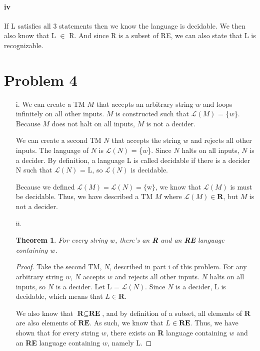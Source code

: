 \documentclass[10pt,letter]{article}
\newtheorem*{thm}{Theorem}
\begin{document}
\paragraph{iv}
If L satisfies all 3 statements then we know the language is decidable. We then also know that L $\in$ R. And since R is a subset of RE, we can also state that L is recognizable. 
\section*{Problem 4}
\begin{enumerate}
\item[i. ] We can create a TM $M$ that accepts an arbitrary string $w$ and loops infinitely on all other inputs. $M$ is constructed such that $\mathscr{L}(M)$ = \{$w$\}. Because $M$ does not halt on all inputs, $M$ is not a decider. 

We can create a second TM $N$ that accepts the string $w$ and rejects all other inputs. The language of $N$ is $\mathscr{L}(N)$ = \{$w$\}. Since $N$ halts on all inputs, $N$ is a decider. By definition, a language L is called decidable if there is a decider N such that $\mathscr{L}(N)$ = L, so $\mathscr{L}(N)$ is decidable. 

Because we defined $\mathscr{L}(M) = \mathscr{L}(N) = \{$w$\}$, we know that $\mathscr{L}(M)$ is must be decidable. Thus, we have described a TM $M$ where $\mathscr{L}(M) \in \textbf{R}$, but $M$ is not a decider.

\item[ii. ] 
\begin{thm} For every string $w$, there's an \textbf{R} and an \textbf{RE} language containing $w$.\end{thm}
\begin{proof} Take the second TM, $N$, described in part i of this problem. For any arbitrary string $w$, $N$ accepts $w$ and rejects all other inputs. $N$ halts on all inputs, so $N$ is a decider. Let L = $\mathscr{L}(N)$. Since $N$ is a decider, L is decidable, which means that $L \in \textbf{R}$. 

We also know that $\textbf{R} \subseteq \textbf{RE}$, and by definition of a subset, all elements of $\textbf{R}$ are also elements of $\textbf{RE}$. As such, we know that $L \in \textbf{RE}$. Thus, we have shown that for every string $w$, there exists an \textbf{R} language containing $w$ and an \textbf{RE} language containing $w$, namely L.
\end{proof}
\end{enumerate}
\end{document}
